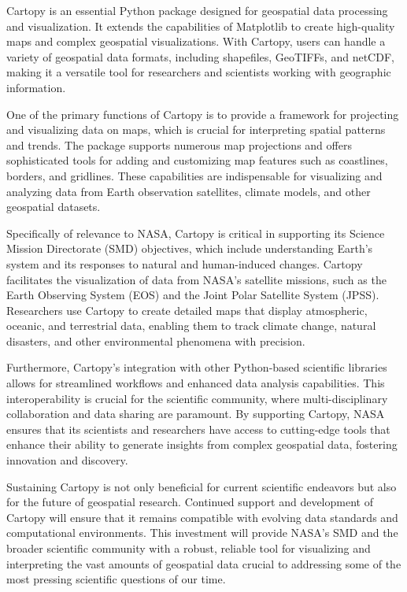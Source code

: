 \documentclass[12pt]{article}
\numberwithin{page}{section}
\begin{document}
Cartopy is an essential Python package designed for geospatial data processing and visualization.
It extends the capabilities of Matplotlib
to create high-quality maps and complex geospatial visualizations.
With Cartopy, users can handle a variety of geospatial data formats,
including shapefiles, GeoTIFFs, and netCDF,
making it a versatile tool for researchers and scientists working with geographic information.

One of the primary functions of Cartopy is to provide a framework for projecting and visualizing data on maps,
which is crucial for interpreting spatial patterns and trends.
The package supports numerous map projections and offers sophisticated tools for
adding and customizing map features such as coastlines, borders, and gridlines.
These capabilities are indispensable for visualizing and analyzing data from
Earth observation satellites, climate models, and other geospatial datasets.

Specifically of relevance to NASA, Cartopy is critical in supporting its Science Mission Directorate (SMD) objectives,
which include understanding Earth's system and its responses to natural and human-induced changes.
Cartopy facilitates the visualization of data from NASA's satellite missions,
such as the Earth Observing System (EOS) and the Joint Polar Satellite System (JPSS).
Researchers use Cartopy to create detailed maps that display atmospheric, oceanic,
and terrestrial data, enabling them to track climate change, natural disasters,
and other environmental phenomena with precision.

Furthermore, Cartopy's integration with other Python-based scientific libraries
allows for streamlined workflows and enhanced data analysis capabilities.
This interoperability is crucial for the scientific community,
where multi-disciplinary collaboration and data sharing are paramount.
By supporting Cartopy, NASA ensures that its scientists and researchers
have access to cutting-edge tools that enhance their ability to generate
insights from complex geospatial data, fostering innovation and discovery.

Sustaining Cartopy is not only beneficial for current scientific endeavors
but also for the future of geospatial research. Continued support and development
of Cartopy will ensure that it remains compatible with evolving data standards
and computational environments. This investment will provide NASA's SMD and the
broader scientific community with a robust, reliable tool for visualizing and
interpreting the vast amounts of geospatial data crucial to addressing some
of the most pressing scientific questions of our time.
\end{document}
